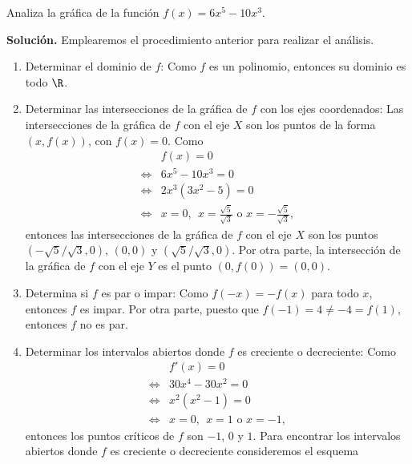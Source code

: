 \documentclass[12pt,a4paper]{book}
\begin{document}
    \begin{ejemplo}\label{ejm:96}
        Analiza la gráfica de la función $f(x)=6x^{5}-10x^{3}$.

        \textbf{Solución.} Emplearemos el procedimiento anterior para realizar el análisis.
        \begin{enumerate}[label=\arabic*.]
            \item Determinar el dominio de $f$: Como $f$ es un polinomio, entonces su dominio
            es todo $\R$.
            \item Determinar las intersecciones de la gráfica de $f$ con los ejes coordenados:
            Las intersecciones de la gráfica de $f$ con el eje $X$ son los puntos de la forma
            $(x,f(x))$, con $f(x)=0$. Como
            \begin{align*}
                &f(x)=0\\
                \Leftrightarrow{}&6x^{5}-10x^{3}=0\\
                \Leftrightarrow{}&2x^{3}\left(3x^{2}-5\right)=0\\
                \Leftrightarrow{}&x=0,\ \ x=\frac{\sqrt{5}}{\sqrt{3}}\text{ o }x=-\frac{\sqrt{5}}{\sqrt{3}},
            \end{align*}
            entonces las intersecciones de la gráfica de $f$ con el eje $X$ son los puntos
            $\left(-\sqrt{5}/\sqrt{3},0\right)$, $(0,0)$ y $\left(\sqrt{5}/\sqrt{3},0\right)$. Por otra parte, la intersección de la
            gráfica de $f$ con el eje $Y$ es el punto $(0,f(0))=(0,0)$.
            \item Determina si $f$ es par o impar: Como $f(-x)=-f(x)$ para todo $x$, entonces
            $f$ es impar. Por otra parte, puesto que $f(-1)=4\neq -4=f(1)$,
            entonces $f$ no es par.
            \item Determinar los intervalos abiertos donde $f$ es creciente o decreciente: Como
            \begin{align*}
                &f'(x)=0\\
                \Leftrightarrow{}&30x^{4}-30x^{2}=0\\
                \Leftrightarrow{}&x^{2}\left(x^{2}-1\right)=0\\
                \Leftrightarrow{}&x=0,\ \ x=1\text{ o }x=-1,
            \end{align*}
            entonces los puntos críticos de $f$ son $-1$, $0$ y $1$. Para encontrar los
            intervalos abiertos donde $f$ es creciente o decreciente consideremos el esquema

\end{enumerate}
\end{ejemplo}
\end{document}
